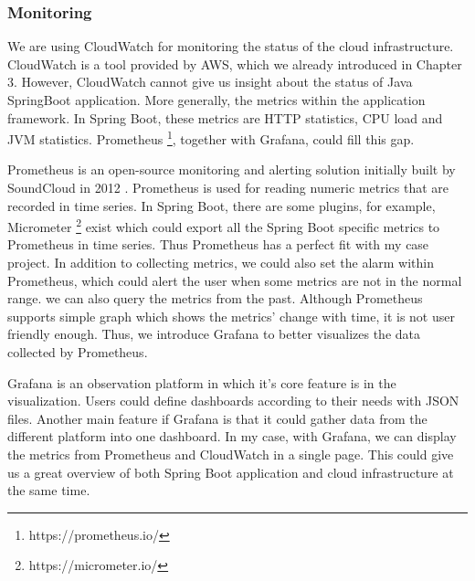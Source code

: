 \subsubsection{Monitoring}
We are using CloudWatch for monitoring the status of the cloud infrastructure. CloudWatch is a tool provided by AWS, which we already introduced in Chapter 3. However, CloudWatch cannot give us insight about the status of Java SpringBoot application. More generally, the metrics within the application framework. In Spring Boot, these metrics are HTTP statistics, CPU load and JVM statistics. Prometheus \footnote{https://prometheus.io/}, together with Grafana, could fill this gap.
\par
Prometheus is an open-source monitoring and alerting solution initially built by SoundCloud in 2012 \cite{Overview30:online}. Prometheus is used for reading numeric metrics that are recorded in time series. In Spring Boot, there are some plugins, for example, Micrometer \footnote{https://micrometer.io/} exist which could export all the Spring Boot specific metrics to Prometheus in time series. Thus Prometheus has a perfect fit with my case project. In addition to collecting metrics, we could also set the alarm within Prometheus, which could alert the user when some metrics are not in the normal range. we can also query the metrics from the past. Although Prometheus supports simple graph which shows the metrics' change with time, it is not user friendly enough. Thus, we introduce Grafana to better visualizes the data collected by Prometheus.
\par
Grafana is an observation platform in which it's core feature is in the visualization. Users could define dashboards according to their needs with JSON files. Another main feature if Grafana is that it could gather data from the different platform into one dashboard. In my case, with Grafana, we can display the metrics from Prometheus and CloudWatch in a single page. This could give us a great overview of both Spring Boot application and cloud infrastructure at the same time.
